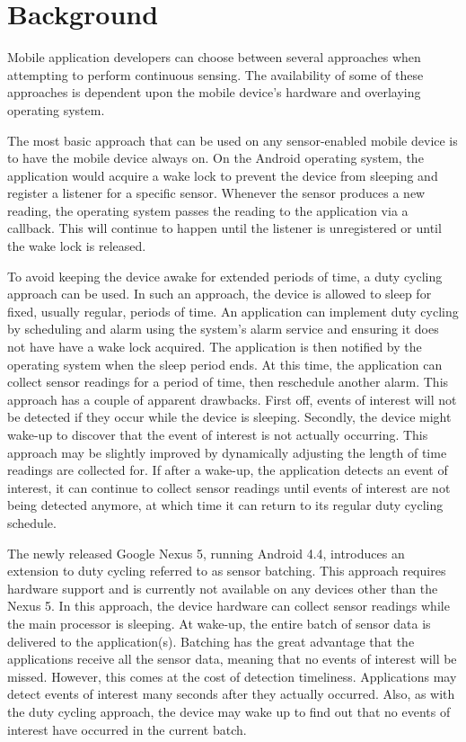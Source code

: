 
\section{Background}
\label{sec:background}

Mobile application developers can choose between several approaches when attempting to perform continuous sensing. The availability of some of these approaches is dependent upon the mobile device's hardware and overlaying operating system. 

The most basic approach that can be used on any sensor-enabled mobile device is to have the mobile device always on. On the Android operating system, the application would acquire a wake lock to prevent the device from sleeping and register a listener for a specific sensor. Whenever the sensor produces a new reading, the operating system passes the reading to the application via a callback. This will continue to happen until the listener is unregistered or until the wake lock is released.

To avoid keeping the device awake for extended periods of time, a duty cycling approach can be used. In such an approach, the device is allowed to sleep for fixed, usually regular, periods of time. An application can implement duty cycling by scheduling and alarm using the system's alarm service and ensuring it does not have have a wake lock acquired. The application is then notified by the operating system when the sleep period ends. At this time, the application can collect sensor readings for a period of time, then reschedule another alarm. This approach has a couple of apparent drawbacks. First off, events of interest will not be detected if they occur while the device is sleeping. Secondly, the device might wake-up to discover that the event of interest is not actually occurring. This approach may be slightly improved by dynamically adjusting the length of time readings are collected for. If after a wake-up, the application detects an event of interest, it can continue to collect sensor readings until events of interest are not being detected anymore, at which time it can return to its regular duty cycling schedule.

The newly released Google Nexus 5, running Android 4.4, introduces an extension to duty cycling referred to as sensor batching. This approach requires hardware support and is currently not available on any devices other than the Nexus 5. In this approach, the device hardware can collect sensor readings while the main processor is sleeping. At wake-up, the entire batch of sensor data is delivered to the application(s). Batching has the great advantage that the applications receive all the sensor data, meaning that no events of interest will be missed. However, this comes at the cost of detection timeliness. Applications may detect events of interest many seconds after they actually occurred. Also, as with the duty cycling approach, the device may wake up to find out that no events of interest have occurred in the current batch.

